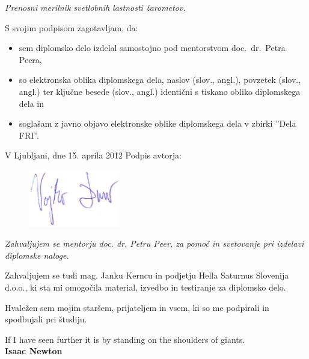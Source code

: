 \documentclass[oneside, a4paper, 12pt]{book}
\newcommand{\clearemptydoublepage}{\newpage{\pagestyle{empty}\cleardoublepage}}
\begin{document}
\vspace{0.5cm}
\emph{Prenosni merilnik svetlobnih lastnosti žarometov.}

\vspace{1.5cm}
\noindent S svojim podpisom zagotavljam, da:
\begin{itemize}
	\item sem diplomsko delo izdelal samostojno pod mentorstvom 
		doc.\ dr.\ Petra Peera,

	\item	so elektronska oblika diplomskega dela, naslov (slov., angl.), 
	povzetek (slov., angl.) ter ključne besede (slov., angl.) identični s 
	tiskano obliko diplomskega dela in
	\item soglašam z javno objavo elektronske oblike diplomskega dela 
	v zbirki ''Dela FRI''.
\end{itemize}

\vspace{1cm}
\noindent V Ljubljani, dne 15. aprila 2012 \hfill Podpis avtorja:
\begin{figure}[h]
\hfill\includegraphics[keepaspectratio=true,width=4cm]{slike/podpis.png}
\end{figure}


\clearemptydoublepage

\thispagestyle{empty}\mbox{}\vfill\null\it%
Zahvaljujem se mentorju doc. dr. Petru Peer, za pomoč in svetovanje pri 
izdelavi diplomske naloge.

Zahvaljujem se tudi mag. Janku Kerncu in podjetju Hella Saturnus 
Slovenija d.o.o., ki sta mi omogočila material, izvedbo in testiranje 
za diplomsko delo.

Hvaležen sem mojim staršem, prijateljem in vsem, ki so me podpirali in 
spodbujali pri študiju.
\rm\normalfont

\clearemptydoublepage

\thispagestyle{empty}\mbox{}{\textheight}\mbox{}\hfill\begin{minipage}{0.90\textwidth}%
\begin{flushright}
If I have seen further it is by standing on the shoulders of giants.\\
\textbf{Isaac Newton}
\end{flushright}
\normalfont\end{minipage}
 
\end{document}
